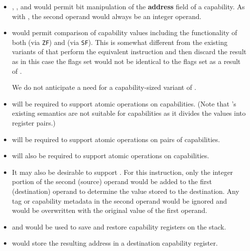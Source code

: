 \begin{itemize}
  \item {}, , and  would
    permit bit manipulation of the \textbf{address} field of a capability.  As
    with , the second operand would always be an
    integer operand.

  \item {} would permit comparison of capability values
    including the functionality of both  (via
    \texttt{ZF}) and  (via \texttt{SF}).  This is
    somewhat different from the existing variants of 
    that perform the equivalent  instruction and then
    discard the result as in this case the flags set would not be
    identical to the flags set as a result of .

    We do not anticipate a need for a capability-sized variant of
    .

  \item {} will be required to support atomic
    operations on capabilities.  (Note that 's
    existing semantics are not suitable for capabilities as it divides
    the values into register pairs.)

  \item {} will be required to support atomic
    operations on pairs of capabilities.

  \item {} will also be required to support atomic
    operations on capabilities.

  \item It may also be desirable to support .  For
    this instruction, only the integer portion of the second (source)
    operand would be added to the first
    (destination) operand to determine the value stored to the
    destination.  Any tag or capability metadata in the second operand
    would be ignored and would be overwritten with the original value
    of the first operand.

  \item {} and  would be used to save
    and restore capability registers on the stack.

  \item {} would store the resulting address in a
    destination capability register.


\end{itemize}
